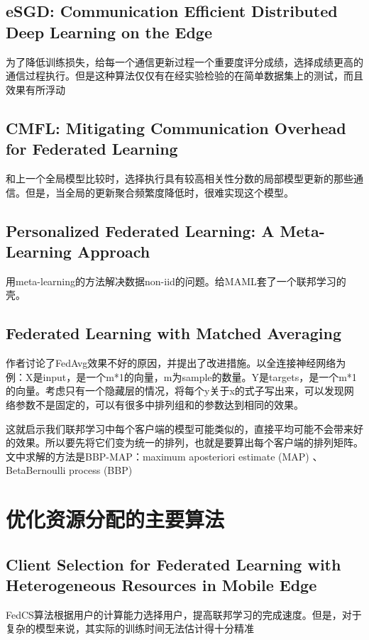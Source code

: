 \documentclass[12pt, a4paper]{article}
\begin{document}
        \subsection*{eSGD: Communication Efficient Distributed Deep Learning on the Edge\cite{216799}}
            为了降低训练损失，给每一个通信更新过程一个重要度评分成绩，选择成绩更高的通信过程执行。但是这种算法仅仅有在经实验检验的在简单数据集上的测试，而且效果有所浮动        
        \subsection*{CMFL: Mitigating Communication Overhead for Federated Learning\cite{8885054}}
            和上一个全局模型比较时，选择执行具有较高相关性分数的局部模型更新的那些通信。但是，当全局的更新聚合频繁度降低时，很难实现这个模型。

        \subsection*{Personalized Federated Learning: A Meta-Learning Approach}
            用meta-learning的方法解决数据non-iid的问题。给MAML套了一个联邦学习的壳。
        \subsection*{Federated Learning with Matched Averaging}
            作者讨论了FedAvg效果不好的原因，并提出了改进措施。以全连接神经网络为例：X是input，是一个m*1的向量，m为sample的数量。Y是targets，是一个m*1的向量。考虑只有一个隐藏层的情况，将每个y关于x的式子写出来，可以发现网络参数不是固定的，可以有很多中排列组和的参数达到相同的效果。

            这就启示我们联邦学习中每个客户端的模型可能类似的，直接平均可能不会带来好的效果。所以要先将它们变为统一的排列，也就是要算出每个客户端的排列矩阵。文中求解的方法是BBP-MAP：maximum aposteriori estimate (MAP) 、BetaBernoulli process (BBP) 
    \section*{优化资源分配的主要算法}
        \subsection*{Client Selection for Federated Learning with Heterogeneous Resources in Mobile Edge\cite{216799}}
            FedCS算法根据用户的计算能力选择用户，提高联邦学习的完成速度。但是，对于复杂的模型来说，其实际的训练时间无法估计得十分精准        
\end{document}
